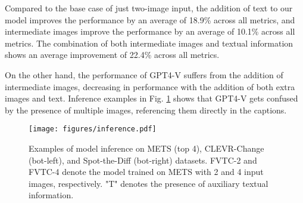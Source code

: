 \documentclass[10pt,twocolumn,letterpaper]{article}
\begin{document}
Compared to the base case of just two-image input, the addition of text to our model improves the performance
by an average of 18.9\% across all metrics, and intermediate images improve the performance
by an average of 10.1\% across all metrics. The combination of both intermediate images and
textual information shows an average improvement of 22.4\% across all metrics. 

On the other hand, the performance of GPT4-V suffers from the addition of intermediate images, 
decreasing in performance with the addition of both extra images and text. Inference examples in
Fig. \ref{fig:inference} shows that GPT4-V gets confused by the presence of
multiple images, referencing them directly in the captions.

\begin{figure}[ht!]
    \centering
    \texttt{[image: figures/inference.pdf]}
    \caption{Examples of model inference on METS (top 4), CLEVR-Change (bot-left), and Spot-the-Diff (bot-right) datasets.
    FVTC-2 and FVTC-4 denote the model trained on METS with 2 and 4 input images, respectively. "T" denotes the presence of auxiliary textual information.}
    \label{fig:inference}
\end{figure}
\end{document}
